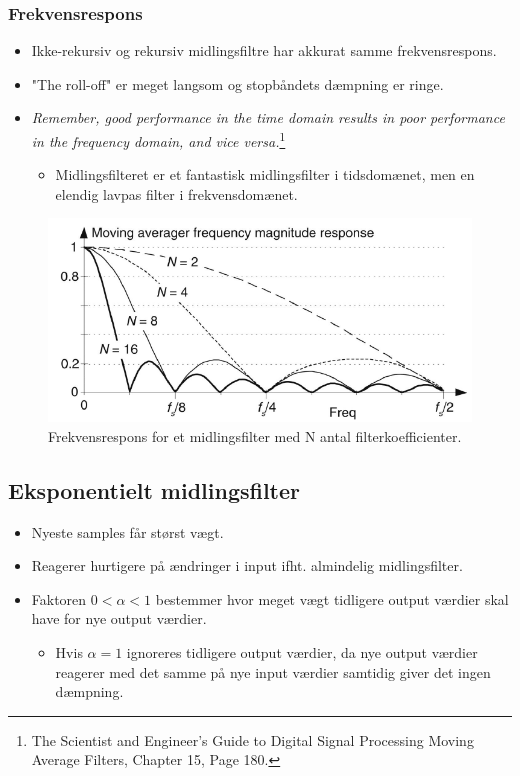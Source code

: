 \documentclass[danish]{article}
\begin{document}
\subsubsection{Frekvensrespons}
\begin{itemize}
	\item Ikke-rekursiv og rekursiv midlingsfiltre har akkurat samme frekvensrespons. 
	\item "The roll-off" er meget langsom og stopbåndets dæmpning er ringe.
	\item \textit{Remember, good performance in the time domain results in poor performance
		in the frequency domain, and vice versa.}\footnote{The Scientist and Engineer's Guide to Digital Signal Processing Moving Average Filters, Chapter 15, Page 180.}
	\begin{itemize}
		\item Midlingsfilteret er et fantastisk midlingsfilter i tidsdomænet, men en elendig lavpas filter i frekvensdomænet.
	\end{itemize}
\end{itemize}


\begin{figure} [H]
	\centering
	\includegraphics[width=0.6\linewidth]{graphics/ma_freqresponse}
	\caption{Frekvensrespons for et midlingsfilter med N antal filterkoefficienter.}
	\label{fig:ma_freqresponse}
\end{figure}

\subsection{Eksponentielt midlingsfilter}
\begin{itemize}
	\item Nyeste samples får størst vægt.
	\item Reagerer hurtigere på ændringer i input ifht. almindelig midlingsfilter.
	\item Faktoren $0<\si{\alpha}<1$ bestemmer hvor meget vægt tidligere output værdier skal have for nye output værdier.
	\begin{itemize}
		\item Hvis $\si{\alpha}=1$ ignoreres tidligere output værdier, da nye output værdier reagerer med det samme på nye input værdier samtidig giver det ingen dæmpning.
	\end{itemize}
\end{itemize}
\end{document}
